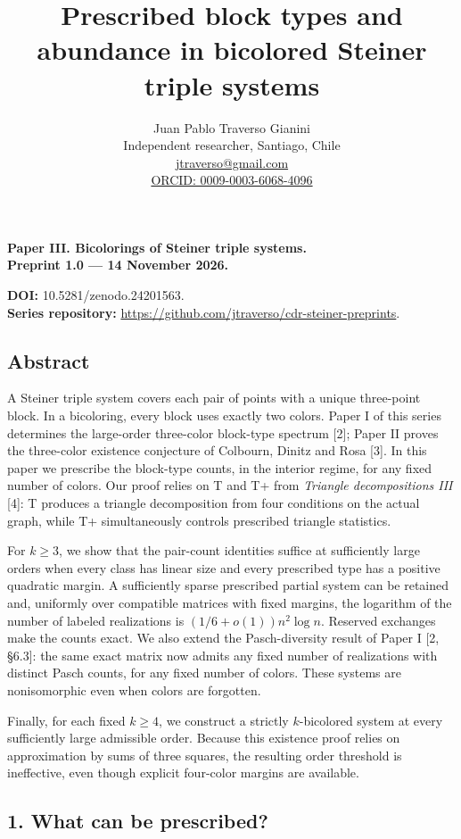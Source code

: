 \documentclass[english,11pt,a4paper]{article}
\title{Prescribed block types and abundance in bicolored Steiner triple systems}
\author{Juan Pablo Traverso Gianini\\\small Independent researcher, Santiago, Chile\\\small \href{mailto:jtraverso@gmail.com}{jtraverso@gmail.com}\\\small \href{https://orcid.org/0009-0003-6068-4096}{ORCID: 0009-0003-6068-4096}}
\date{}
\begin{document}
\raggedbottom\maketitle
\textbf{Paper III. Bicolorings of Steiner triple systems.}\\
\textbf{Preprint 1.0 --- 14 November 2026.}

\textbf{DOI:} 10.5281/zenodo.24201563.\\
\textbf{Series repository:} \url{https://github.com/jtraverso/cdr-steiner-preprints}.

\subsection{Abstract}\label{abstract}

A Steiner triple system covers each pair of points with a unique three-point block. In a bicoloring, every block uses exactly two colors. Paper I of this series determines the large-order three-color block-type spectrum {[}2{]}; Paper II proves the three-color existence conjecture of Colbourn, Dinitz and Rosa {[}3{]}. In this paper we prescribe the block-type counts, in the interior regime, for any fixed number of colors. Our proof relies on T and T+ from \emph{Triangle decompositions III} {[}4{]}: T produces a triangle decomposition from four conditions on the actual graph, while T+ simultaneously controls prescribed triangle statistics.

For \(k\ge3\), we show that the pair-count identities suffice at sufficiently large orders when every class has linear size and every prescribed type has a positive quadratic margin. A sufficiently sparse prescribed partial system can be retained and, uniformly over compatible matrices with fixed margins, the logarithm of the number of labeled realizations is \((1/6+o(1))n^2\log n\). Reserved exchanges make the counts exact. We also extend the Pasch-diversity result of Paper I {[}2, §6.3{]}: the same exact matrix now admits any fixed number of realizations with distinct Pasch counts, for any fixed number of colors. These systems are nonisomorphic even when colors are forgotten.

Finally, for each fixed \(k\ge4\), we construct a strictly \(k\)-bicolored system at every sufficiently large admissible order. Because this existence proof relies on approximation by sums of three squares, the resulting order threshold is ineffective, even though explicit four-color margins are available.

\subsection{1. What can be prescribed?}\label{what-can-be-prescribed}
\end{document}
